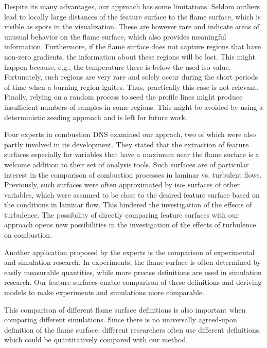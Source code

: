 %
Despite its many advantages, our approach has some limitations. Seldom outliers
lead to locally large distances of the feature surface to the flame surface,
which is visible as spots in the visualization. These are however rare and
indicate areas of unusual behavior on the flame surface, which also provides
meaningful information.
%
%
Furthermore, if the flame surface does not capture regions that have non-zero
gradients, the information about these regions will be lost. This might happen
because, e.g., the temperature there is below the used iso-value. Fortunately,
such regions are very rare and solely occur during the short periods of time
when a burning region ignites. Thus, practically this case is not relevant.
%
%
Finally, relying on a random process to seed the profile lines might produce
insufficient numbers of samples in some regions. This might be avoided by using
a deterministic seeding approach and is left for future work.

Four experts in combustion \ac{DNS} examined our apprach, two of which were also
partly involved in its development. They stated that the extraction of feature
surfaces especially for variables that have a maximum near the flame surface is
a welcome addition to their set of analysis tools. Such surfaces are of
particular interest in the comparison of combustion processes in laminar vs.
turbulent flows. Previously, such surfaces were often approximated by iso-
surfaces of other variables, which were assumed to be close to the desired
feature surface based on the conditions in laminar flow. This hindered the
investigation of the effects of turbulence. The possibility of directly
comparing feature surfaces with our approach opens new possibilities in the
investigation of the effects of turbulence on combustion.

Another application proposed by the experts is the comparison of experimental
and simulation research. In experiments, the flame surface is often determined
by easily measurable quantities, while more precise definitions are used in
simulation research. Our feature surfaces enable comparison of these definitions
and deriving models to make experiments and simulations more comparable.

This comparison of different flame surface definitions is also important when
comparing different simulations. Since there is no universally agreed-upon
definition of the flame surface, different researchers often use different
definitions, which could be quantitatively compared with our method.

